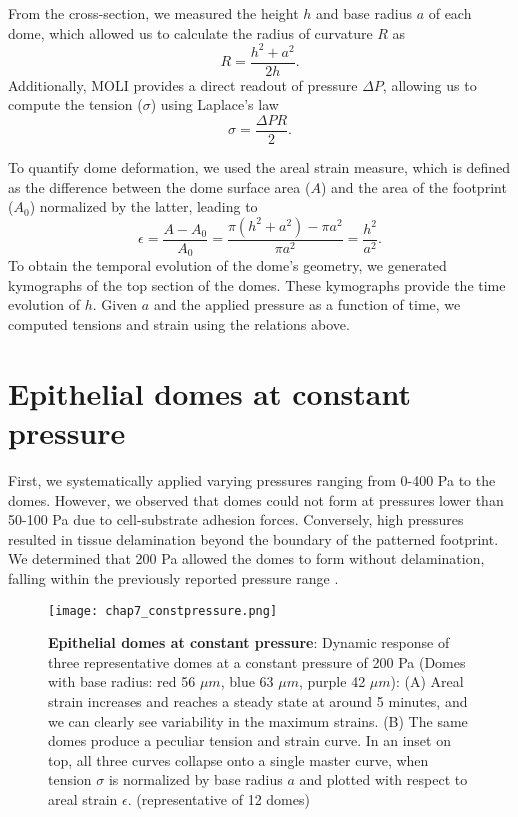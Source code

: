 From the cross-section, we measured the height $h$ and base radius $a$ of each dome, which allowed us to calculate the radius of curvature $R$ as
\begin{equation}
	\label{eqn:radiuscurve}
	R = \frac{h^2 + a^2}{2h}.
\end{equation}
Additionally, MOLI provides a direct readout of pressure $\Delta P$, allowing us to compute the tension ($\sigma$) using Laplace's law
\begin{equation}
	\label{eqn:laplace}
	\sigma = \frac{\Delta PR }{2} .
\end{equation}

To quantify dome deformation, we used the areal strain measure, which is defined as the difference between the dome surface area ($A$) and the area of the footprint ($A_{0}$) normalized by the latter, leading to
\begin{equation}
	\label{eqn:arealstrain}
	\epsilon = \frac{A - A_{0}}{A_{0}} = \frac{\pi(h^2 + a^2) - \pi a^2}{\pi a^2} = \frac{h^2}{a^2} .
\end{equation}
To obtain the temporal evolution of the dome’s geometry, we generated kymographs of the top section of the domes. These kymographs provide the time evolution of $h$. Given $a$ and the applied pressure as a function of time, we computed tensions and strain using the relations above.

\hypertarget{epithelial-domes-at-constant-pressure}{%
	\section{Epithelial domes at constant
		pressure}\label{epithelial-domes-at-constant-pressure}}

First, we systematically applied varying pressures ranging from 0-400 \unit{\pascal} to the domes. However, we observed that domes could not form at pressures lower than 50-100 \unit{\pascal} due to cell-substrate adhesion forces. Conversely, high pressures resulted in tissue delamination beyond the boundary of the patterned footprint. We determined that 200 \unit{\pascal} allowed the domes to form without delamination, falling within the previously reported pressure range \cite{choudhury2022,marin-llaurado2022}.

\begin{figure}[b!]
	\centering
	\texttt{[image: chap7\_constpressure.png]}
	\caption{\label{fig_7_3} \textbf{Epithelial domes at constant pressure}: Dynamic response of three representative domes at a constant pressure of 200 Pa (Domes with base radius: red 56 $\mu m$, blue 63 $\mu m$, purple 42 $\mu m$): (A) Areal strain increases and reaches a steady state at around 5 minutes, and we can clearly see variability in the maximum strains. (B) The same domes produce a peculiar tension and strain curve. In an inset on top, all three curves collapse onto a single  master curve, when tension $\sigma$ is normalized by base radius $a$ and plotted with respect to areal strain $\epsilon$. (representative of 12 domes)
	}
\end{figure}

